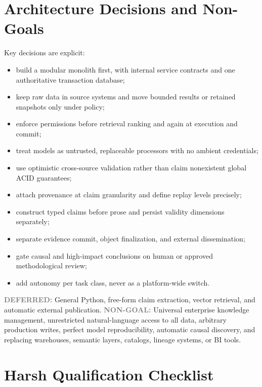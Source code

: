 \documentclass[10pt]{article}
\newcommand{\deferred}{\textbf{\textcolor{gray}{DEFERRED:}}\xspace}
\newcommand{\nongoal}{\textbf{\textcolor{gray}{NON-GOAL:}}\xspace}
\begin{document}
\section{Architecture Decisions and Non-Goals}

Key decisions are explicit:
\begin{itemize}
  \item build a modular monolith first, with internal service contracts and one authoritative transaction database;
  \item keep raw data in source systems and move bounded results or retained snapshots only under policy;
  \item enforce permissions before retrieval ranking and again at execution and commit;
  \item treat models as untrusted, replaceable processors with no ambient credentials;
  \item use optimistic cross-source validation rather than claim nonexistent global ACID guarantees;
  \item attach provenance at claim granularity and define replay levels precisely;
  \item construct typed claims before prose and persist validity dimensions separately;
  \item separate evidence commit, object finalization, and external dissemination;
  \item gate causal and high-impact conclusions on human or approved methodological review;
  \item add autonomy per task class, never as a platform-wide switch.
\end{itemize}

\deferred General Python, free-form claim extraction, vector retrieval, and automatic external publication. \nongoal Universal enterprise knowledge management, unrestricted natural-language access to all data, arbitrary production writes, perfect model reproducibility, automatic causal discovery, and replacing warehouses, semantic layers, catalogs, lineage systems, or BI tools.

\section{Harsh Qualification Checklist}
\end{document}
